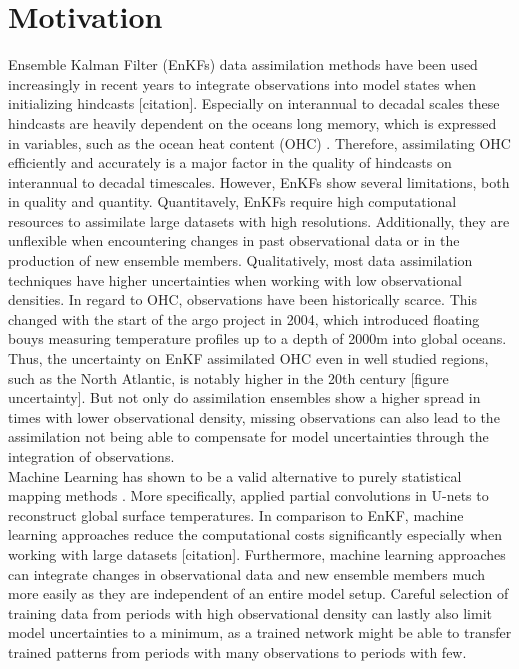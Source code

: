 \documentclass[11pt,a4paper]{scrreprt}	%
\begin{document}
	
	\onehalfspacing
	\section{Motivation}
	
	Ensemble Kalman Filter (EnKFs) data assimilation methods have been used increasingly in recent years to integrate observations into model states when initializing hindcasts [citation]. Especially on interannual to decadal scales these hindcasts are heavily dependent on the oceans long memory, which is expressed in variables, such as the ocean heat content (OHC) \cite{brune_preserving_2020}. Therefore, assimilating OHC efficiently and accurately is a major factor in the quality of hindcasts on interannual to decadal timescales. However, EnKFs show several limitations, both in quality and quantity. Quantitavely, EnKFs require high computational resources to assimilate large datasets with high resolutions. Additionally, they are unflexible when encountering changes in past observational data or in the production of new ensemble members. Qualitatively, most data assimilation techniques have higher uncertainties when working with low observational densities. In regard to OHC, observations have been historically scarce. This changed with the start of the argo project in 2004, which introduced floating bouys measuring temperature profiles up to a depth of 2000m into global oceans. Thus, the uncertainty on EnKF assimilated OHC even in well studied regions, such as the North Atlantic, is notably higher in the 20th century [figure uncertainty]. But not only do assimilation ensembles show a higher spread in times with lower observational density, missing observations can also lead to the assimilation not being able to compensate for model uncertainties through the integration of observations. \\
	Machine Learning has shown to be a valid alternative to purely statistical mapping methods \cite{kadow_artificial_2020}. More specifically, \cite{kadow_artificial_2020} applied partial convolutions in U-nets to reconstruct global surface temperatures. In comparison to EnKF, machine learning approaches reduce the computational costs significantly especially when working with large datasets [citation]. Furthermore, machine learning approaches can integrate changes in observational data and new ensemble members much more easily as they are independent of an entire model setup. Careful selection of training data from periods with high observational density can lastly also limit model uncertainties to a minimum, as a trained network might be able to transfer trained patterns from periods with many observations to periods with few. \\
	
\end{document}
